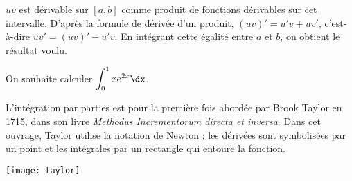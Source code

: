 \documentclass[11pt,fleqn, openany]{book} %
\begin{document}
\begin{demonstration}$uv$ est dérivable sur $[a,b]$ comme produit de fonctions dérivables sur cet intervalle. D'après la formule de dérivée d'un produit, $(uv)'=u'v+uv'$, c'est-à-dire $uv'=(uv)'-u'v$. En intégrant cette égalité entre $a$ et $b$, on obtient le résultat voulu.\end{demonstration}

\begin{example} On souhaite calculer $\displaystyle\int_{0}^1x\e^{2x} \dx$.

\vskip200pt

\end{example}

L'intégration par parties est pour la première fois abordée par Brook Taylor en 1715, dans son livre \textit{Methodus Incrementorum directa et inversa}. Dans cet ouvrage, Taylor utilise la notation de Newton : les dérivées sont symbolisées par un point et les intégrales par un rectangle qui entoure la fonction. 

\begin{center}
\texttt{[image: taylor]}
\end{center}
\end{document}
